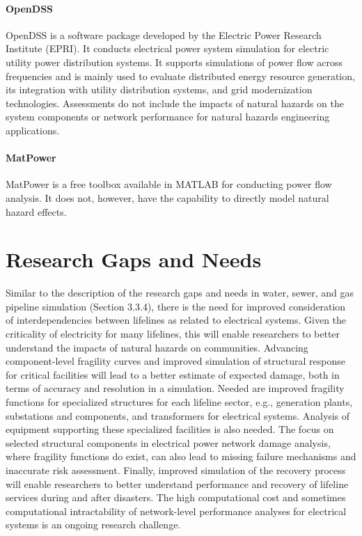 \paragraph{OpenDSS} OpenDSS is a software package developed by the Electric Power Research Institute (EPRI). It conducts electrical power system simulation for electric utility power distribution systems. It supports simulations of power flow across frequencies and is mainly used to evaluate distributed energy resource generation, its integration with utility distribution systems, and grid modernization technologies. Assessments do not include the impacts of natural hazards on the system components or network performance for natural hazards engineering applications.

\paragraph{MatPower} MatPower \citep{zimmerman2011matpower} is a free toolbox available in MATLAB for conducting power flow analysis. It does not, however, have the capability to directly model natural hazard effects.

\section{Research Gaps and Needs}
\label{sec:perf_power_gaps}

Similar to the description of the research gaps and needs in water, sewer, and gas pipeline simulation (Section 3.3.4), there is the need for improved consideration of interdependencies between lifelines as related to electrical systems. Given the criticality of electricity for many lifelines, this will enable researchers to better understand the impacts of natural hazards on communities. Advancing component-level fragility curves and improved simulation of structural response for critical facilities will lead to a better estimate of expected damage, both in terms of accuracy and resolution in a simulation. Needed are improved fragility functions for specialized structures for each lifeline sector, e.g., generation plants, substations and components, and transformers for electrical systems. Analysis of equipment supporting these specialized facilities is also needed. The focus on selected structural components in electrical power network damage analysis, where fragility functions do exist, can also lead to missing failure mechanisms and inaccurate risk assessment. Finally, improved simulation of the recovery process will enable researchers to better understand performance and recovery of lifeline services during and after disasters. The high computational cost and sometimes computational intractability of network-level performance analyses for electrical systems is an ongoing research challenge.

